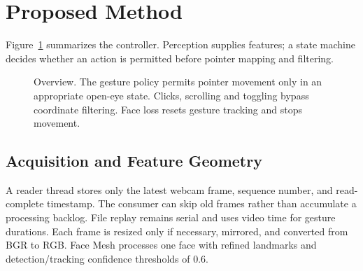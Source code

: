 \documentclass[10pt,twocolumn,letterpaper]{article}
\begin{document}
\section{Proposed Method}
Figure~\ref{fig:overview} summarizes the controller. Perception supplies features; a state machine decides whether an action is permitted before pointer mapping and filtering.
\begin{figure}[t]
\centering
{}
\caption{Overview. The gesture policy permits pointer movement only in an appropriate open-eye state. Clicks, scrolling and toggling bypass coordinate filtering. Face loss resets gesture tracking and stops movement.}
\label{fig:overview}
\end{figure}

\subsection{Acquisition and Feature Geometry}
A reader thread stores only the latest webcam frame, sequence number, and read-complete timestamp. The consumer can skip old frames rather than accumulate a processing backlog. File replay remains serial and uses video time for gesture durations. Each frame is resized only if necessary, mirrored, and converted from BGR to RGB. Face Mesh processes one face with refined landmarks and detection/tracking confidence thresholds of 0.6.
\end{document}
